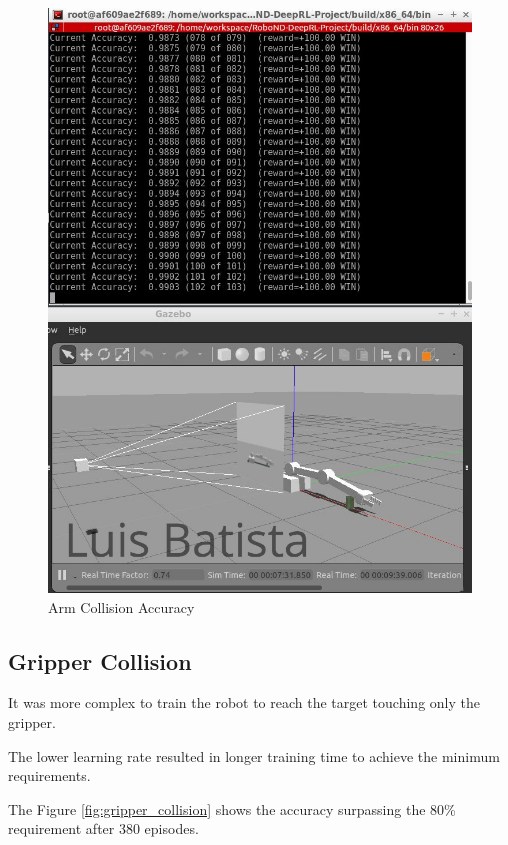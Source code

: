 \documentclass[10pt,journal,compsoc]{IEEEtran}
\begin{document}
\begin{figure}[thpb]
      \centering
      \includegraphics[width=\linewidth]{arm_collision.png}
      \caption{Arm Collision Accuracy}
      \label{fig:arm_collision}
\end{figure}


\subsection{Gripper Collision}
It was more complex to train the robot to reach the target touching only the gripper.

The lower learning rate resulted in longer training time to achieve the minimum requirements. 

The Figure \ref{fig:gripper_collision} shows the accuracy surpassing the 80\% requirement after 380 episodes.
\end{document}
